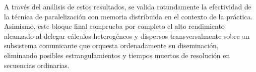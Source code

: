 A través del análisis de estos resultados, se valida rotundamente la efectividad de la técnica de paralelización con memoria distribuida en el contexto de la práctica. Asimismo, este bloque final comprueba por completo el alto rendimiento alcanzado al delegar cálculos heterogéneos y dispersos transversalmente sobre un subsistema comunicante que orquesta ordenadamente su diseminación, eliminando posibles estrangulamientos y tiempos muertos de resolución en secuencias ordinarias.



